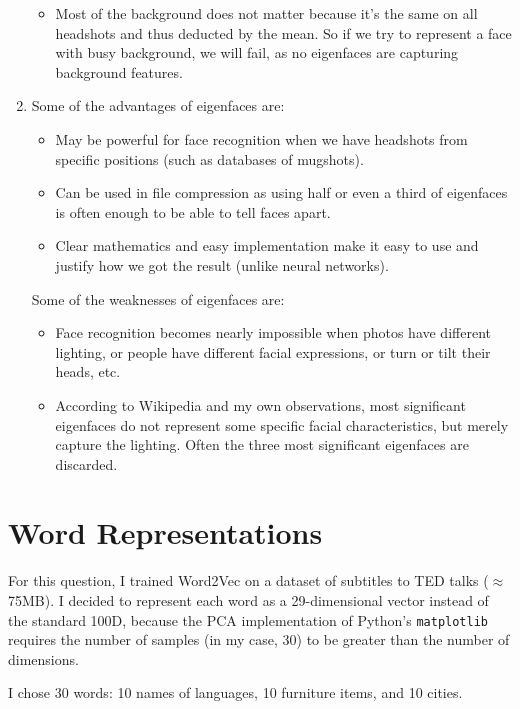 \documentclass{article}
\begin{document}
\begin{enumerate}
\begin{itemize}
\item
Most of the background does not matter because it's the same on all headshots and thus deducted by the mean. So if we try to represent a face with busy background, we will fail, as no eigenfaces are capturing background features.

\end{itemize}

\item
Some of the advantages of eigenfaces are:
\begin{itemize}
\item
May be powerful for face recognition when we have headshots from specific positions (such as databases of mugshots).
\item
Can be used in file compression as using half or even a third of eigenfaces is often enough to be able to tell faces apart.
\item
Clear mathematics and easy implementation make it easy to use and justify how we got the result (unlike neural networks).
\end{itemize}

Some of the weaknesses of eigenfaces are:
\begin{itemize}
\item
Face recognition becomes nearly impossible when photos have different lighting, or people have different facial expressions, or turn or tilt their heads, etc.
\item
According to Wikipedia and my own observations, most significant eigenfaces do not represent some specific facial characteristics, but merely capture the lighting. Often the  three most significant eigenfaces are discarded.
\end{itemize}

\end{enumerate}


\section{Word Representations}

For this question, I trained Word2Vec on a dataset of subtitles to TED talks ($\approx$75MB). I decided to represent each word as a 29-dimensional vector instead of the standard 100D, because the PCA implementation of Python's \texttt{matplotlib} requires the number of samples (in my case, 30) to be greater than the number of dimensions.

I chose 30 words: 10 names of languages, 10 furniture items, and 10 cities.
\end{document}
